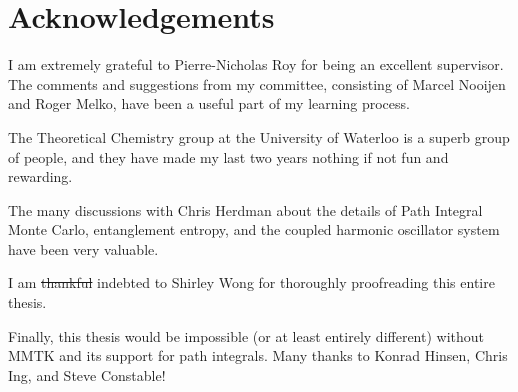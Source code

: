\chapter*{Acknowledgements}

I am extremely grateful to Pierre-Nicholas Roy for being an excellent supervisor.
The comments and suggestions from my committee, consisting of Marcel Nooijen and Roger Melko, have been a useful part of my learning process.

The Theoretical Chemistry group at the University of Waterloo is a superb group of people, and they have made my last two years nothing if not fun and rewarding.

The many discussions with Chris Herdman about the details of Path Integral Monte Carlo, entanglement entropy, and the coupled harmonic oscillator system have been very valuable.

I am \sout{thankful} indebted to Shirley Wong for thoroughly proofreading this entire thesis.

Finally, this thesis would be impossible (or at least entirely different) without MMTK and its support for path integrals.
Many thanks to Konrad Hinsen, Chris Ing, and Steve Constable!
